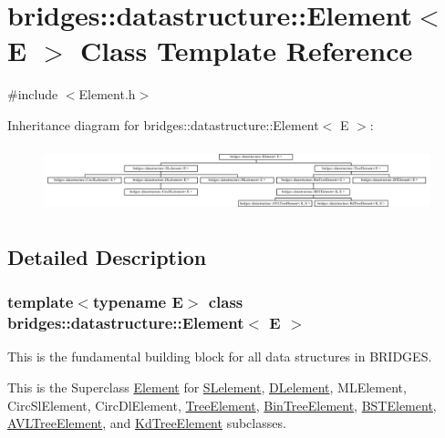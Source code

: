 \hypertarget{classbridges_1_1datastructure_1_1_element}{}\section{bridges\+:\+:datastructure\+:\+:Element$<$ E $>$ Class Template Reference}
\label{classbridges_1_1datastructure_1_1_element}


{\ttfamily \#include $<$Element.\+h$>$}

Inheritance diagram for bridges\+:\+:datastructure\+:\+:Element$<$ E $>$\+:\begin{figure}[H]
\begin{center}
\leavevmode
\includegraphics[height=1.917808cm]{classbridges_1_1datastructure_1_1_element}
\end{center}
\end{figure}


\subsection{Detailed Description}
\subsubsection*{template$<$typename E$>$\newline
class bridges\+::datastructure\+::\+Element$<$ E $>$}

This is the fundamental building block for all data structures in B\+R\+I\+D\+G\+ES. 

This is the Superclass \hyperlink{classbridges_1_1datastructure_1_1_element}{Element} for \hyperlink{classbridges_1_1datastructure_1_1_s_lelement}{S\+Lelement}, \hyperlink{classbridges_1_1datastructure_1_1_d_lelement}{D\+Lelement}, M\+L\+Element, Circ\+Sl\+Element, Circ\+Dl\+Element, \hyperlink{classbridges_1_1datastructure_1_1_tree_element}{Tree\+Element}, \hyperlink{classbridges_1_1datastructure_1_1_bin_tree_element}{Bin\+Tree\+Element}, \hyperlink{classbridges_1_1datastructure_1_1_b_s_t_element}{B\+S\+T\+Element}, \hyperlink{classbridges_1_1datastructure_1_1_a_v_l_tree_element}{A\+V\+L\+Tree\+Element}, and \hyperlink{classbridges_1_1datastructure_1_1_kd_tree_element}{Kd\+Tree\+Element} subclasses.

